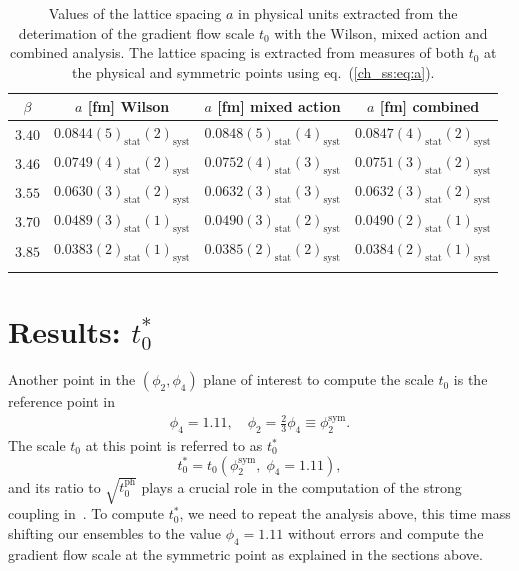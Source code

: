 \begin{longtable}{c c c c}
\label{ch_ss:tab:a}
$\beta$ & $a$ [fm] Wilson & $a$ [fm] mixed action & $a$ [fm] combined \\
\toprule
$3.40$ & $0.0844(5)_{\textrm{stat}}(2)_{\textrm{syst}}$ & $0.0848(5)_{\textrm{stat}}(4)_{\textrm{syst}}$ & $0.0847(4)_{\textrm{stat}}(2)_{\textrm{syst}}$ \\
$3.46$ & $0.0749(4)_{\textrm{stat}}(2)_{\textrm{syst}}$ & $0.0752(4)_{\textrm{stat}}(3)_{\textrm{syst}}$ & $0.0751(3)_{\textrm{stat}}(2)_{\textrm{syst}}$ \\
$3.55$ & $0.0630(3)_{\textrm{stat}}(2)_{\textrm{syst}}$ & $0.0632(3)_{\textrm{stat}}(3)_{\textrm{syst}}$ & $0.0632(3)_{\textrm{stat}}(2)_{\textrm{syst}}$ \\
$3.70$ & $0.0489(3)_{\textrm{stat}}(1)_{\textrm{syst}}$ & $0.0490(3)_{\textrm{stat}}(2)_{\textrm{syst}}$ & $0.0490(2)_{\textrm{stat}}(1)_{\textrm{syst}}$ \\
$3.85$ & $0.0383(2)_{\textrm{stat}}(1)_{\textrm{syst}}$ & $0.0385(2)_{\textrm{stat}}(2)_{\textrm{syst}}$ & $0.0384(2)_{\textrm{stat}}(1)_{\textrm{syst}}$ \\
\bottomrule
\caption{Values of the lattice spacing $a$ in physical units extracted from the deterimation of the gradient flow scale $t_0$ with the Wilson, mixed action and combined analysis. The lattice spacing is extracted from measures of both $t_0$ at the physical and symmetric points using eq.~(\ref{ch_ss:eq:a}).}
\end{longtable}

\section{Results: $t_0^*$}

Another point in the $(\phi_2,\phi_4)$ plane of interest to compute the scale $t_0$ is the reference point in~\citep{Bruno:2016plf}
\begin{gather}
\phi_4=1.11, \quad \phi_2=\frac{2}{3}\phi_4\equiv\phi_2^{\textrm{sym}}.
\end{gather}
The scale $t_0$ at this point is referred to as $t_0^*$
\begin{equation}
t_0^*=t_0\left(\phi_2^{\textrm{sym}},\;\phi_4=1.11\right),
\end{equation}
and its ratio to $\sqrt{t_0^{\textrm{ph}}}$ plays a crucial role in the computation of the strong coupling in~\citep{DallaBrida:2022eua}. To compute $t_0^{*}$, we need to repeat the analysis above, this time mass shifting our ensembles to the value $\phi_4=1.11$ without errors and compute the gradient flow scale at the symmetric point as explained in the sections above.

